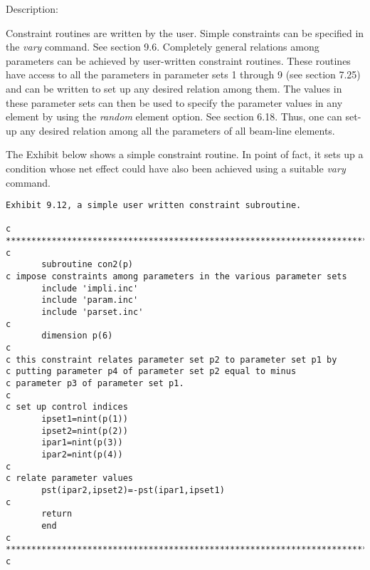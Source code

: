 \vspace{5mm}
     Description:
\vspace{2mm}

Constraint routines are written by the user.  Simple constraints can be specified in the {\em vary} command.  See section 9.6.  Completely general relations among parameters can be achieved by user-written constraint routines.  These routines have access to all the parameters in parameter sets 1 through 9 (see section 7.25) and can be written to set up any desired relation among them.  The values in these parameter sets can then be used to specify the parameter values in any element by using the {\em random} element option.  See section 6.18.  Thus, one can set-up any desired relation among all the parameters of all beam-line elements.

The Exhibit below shows a simple constraint routine.  In point of fact, it sets up a condition whose net effect could have also been achieved using a suitable {\em vary} command.

\vspace{5mm}
\begin{footnotesize}
\begin{verbatim}
Exhibit 9.12, a simple user written constraint subroutine.

c
************************************************************************
c
       subroutine con2(p)
c impose constraints among parameters in the various parameter sets
       include 'impli.inc'
       include 'param.inc'
       include 'parset.inc'
c
       dimension p(6)
c
c this constraint relates parameter set p2 to parameter set p1 by
c putting parameter p4 of parameter set p2 equal to minus
c parameter p3 of parameter set p1.
c
c set up control indices
       ipset1=nint(p(1))
       ipset2=nint(p(2))
       ipar1=nint(p(3))
       ipar2=nint(p(4))
c
c relate parameter values
       pst(ipar2,ipset2)=-pst(ipar1,ipset1)
c
       return
       end
c
************************************************************************
c
\end{verbatim}
\end{footnotesize}

\newpage
